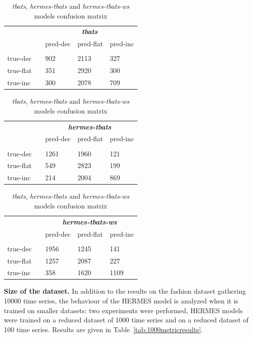 \documentclass[lettersize,journal]{IEEEtran}
\begin{document}
\begin{table}
  \caption{\textit{tbats}, \textit{hermes-tbats} and \textit{hermes-tbats-ws} models confusion matrix }
\centering
  \begin{tabular}{l||llll}
  	&& \multicolumn{3}{c}{\textbf{\textit{tbats}}}\\
    && pred-dec  & pred-flat & pred-inc  \\
    \hline
    \hline
    \rule{0pt}{2ex} \\
	true-dec && 902 & 2113 & 327 \\
    true-flat && 351 & 2920 & 300 \\
    true-inc && 300 & 2078 & 709 
  \end{tabular}

\vspace{.2cm}

  \begin{tabular}{l||llll}
  	&& \multicolumn{3}{c}{\textbf{\textit{hermes-tbats}}}\\
    && pred-dec  & pred-flat & pred-inc  \\
    \hline
    \hline
    \rule{0pt}{2ex} \\
	true-dec && 1261 & 1960 & 121 \\
    true-flat && 549 & 2823 & 199 \\
    true-inc && 214 & 2004 & 869 
  \end{tabular}

\vspace{.2cm}

  \begin{tabular}{l||llll}
    && \multicolumn{3}{c}{\textbf{\textit{hermes-tbats-ws}}}\\
    && pred-dec  & pred-flat & pred-inc  \\
    \hline
    \hline
    \rule{0pt}{2ex} \\
	true-dec && 1956 & 1245 & 141 \\
    true-flat && 1257 & 2087 & 227 \\
    true-inc && 358 & 1620 & 1109 
  \end{tabular}
\label{tab:tbatsclass}
\end{table}

\textbf{Size of the dataset. } In addition to the results on the fashion dataset gathering 10000 time series, the behaviour of the HERMES model is analyzed when it is trained on smaller datasets: two experiments were performed, HERMES models were trained on a reduced dataset of 1000 time series and on a reduced dataset of 100 time series. Results are given in Table~\ref{tab:1000metricresults}.
\end{document}
